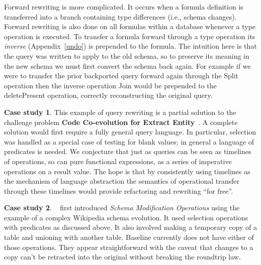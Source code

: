 \documentclass[english,submission]{programming}
\theoremstyle{definition}
\newtheorem{casestudy}{Case study}
\newcommand{\citet}[1]{\citeauthor*{#1}~\cite{#1}}
\begin{document}
Forward rewriting is more complicated. It occurs when a formula definition is transferred into a branch containing type differences (i.e., schema changes). Forward rewriting is also done on all formulas within a database whenever a type operation is executed. To transfer a formula forward through a type operation its \textit{inverse} (Appendix~\ref{undo}) is prepended to the formula. The intuition here is that the query was written to apply to the old schema, so to preserve its meaning in the new schema we must first convert the schema back again.
For example if we were to transfer the prior backported query forward again through the \textsf{Split} operation then the inverse operation \textsf{Join} would be prepended to the \textsf{deletePresent} operation, correctly reconstructing the original query.


\begin{casestudy}\label{case-query}
This example of query rewriting is a partial solution to the challenge problem \textbf{Code Co-evolution for Extract Entity}~\cite{challenge-problems}. A complete solution would first require a fully general query language. In particular, selection was handled as a special case of testing for blank values; in general a language of predicates is needed.
We conjecture that just as queries can be seen as timelines of operations, so can pure functional expressions, as a series of imperative operations on a result value. The hope is that by consistently using timelines as the mechanism of language abstraction the semantics of operational transfer through these timelines would provide refactoring and rewriting ``for free''.
\end{casestudy}


\begin{casestudy}
\citet{curino08} first introduced \textit{Schema Modification Operations} using the example of a complex Wikipedia schema evolution. It used selection operations with predicates as discussed above. It also involved making a temporary copy of a table and unioning with another table. Baseline currently does not have either of those operations. They appear straightforward with the caveat that changes to a copy can't be retracted into the original without breaking the roundtrip law.
\end{casestudy}
\end{document}
